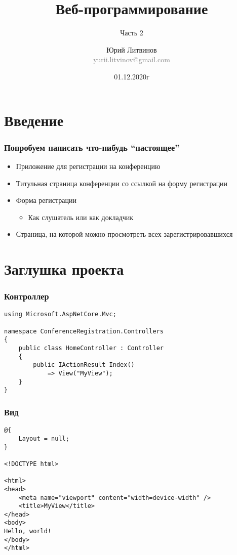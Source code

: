 \documentclass[xetex,mathserif,serif]{beamer}
\title{Веб-программирование}
\subtitle{Часть 2}
\author[Юрий Литвинов]{Юрий Литвинов\\\small{\textcolor{gray}{yurii.litvinov@gmail.com}}}
\date{01.12.2020г}
\begin{document}
    \frame{\titlepage}

    \section{Введение}

    \begin{frame}
        \frametitle{Попробуем написать что-нибудь ``настоящее''}
        \begin{itemize}
            \item Приложение для регистрации на конференцию
            \item Титульная страница конференции со ссылкой на форму регистрации
            \item Форма регистрации
            \begin{itemize}
                \item Как слушатель или как докладчик
            \end{itemize}
            \item Страница, на которой можно просмотреть всех зарегистрировавшихся
        \end{itemize}
    \end{frame}

    \section{Заглушка проекта}

    \begin{frame}[fragile]
        \frametitle{Контроллер}
        \begin{verbatim}
using Microsoft.AspNetCore.Mvc;

namespace ConferenceRegistration.Controllers
{
    public class HomeController : Controller
    {
        public IActionResult Index()
            => View("MyView");
    }
}
        \end{verbatim}
    \end{frame}

    \begin{frame}[fragile]
        \frametitle{Вид}
        \begin{verbatim}
@{
    Layout = null;
}

<!DOCTYPE html>

<html>
<head>
    <meta name="viewport" content="width=device-width" />
    <title>MyView</title>
</head>
<body>
Hello, world!
</body>
</html>
        \end{verbatim}
    \end{frame}
\end{document}
